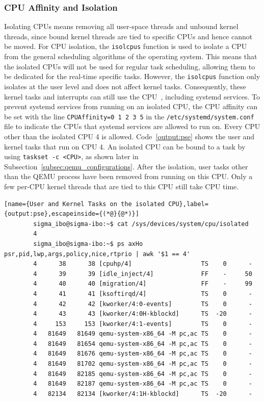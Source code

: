 \documentclass[MMR,Master,english]{style/twbook}
\begin{document}
\subsubsection{CPU Affinity and Isolation}\label{subsubsec:cpu_isolation}
Isolating CPUs means removing all user-space threads and unbound kernel threads, since bound kernel threads are tied to specific CPUs and hence cannot be moved. For CPU isolation, the \texttt{isolcpus} function is used to isolate a CPU from the general scheduling algorithms of the operating system. This means that the isolated CPUs will not be used for regular task scheduling, allowing them to be dedicated for the real-time specific tasks. However, the \texttt{isolcpus} function only isolates at the user level and does not affect kernel tasks. Consequently, these kernel tasks and interrupts can still use the CPU~\cite{maPerformanceTuningKVMbased2013}, including systemd services. To prevent systemd services from running on an isolated CPU, the CPU affinity can be set with the line \texttt{CPUAffinity=0 1 2 3 5} in the \texttt{/etc/systemd/system.conf} file to indicate the CPUs that systemd services are allowed to run on. Every CPU other than the isolated CPU 4 is allowed. Code~\ref{output:pse} shows the user and kernel tasks that run on CPU 4. An isolated CPU can be bound to a task by using \texttt{taskset -c <CPU>}, as shown later in Subsection~\ref{subsec:qemu_configurations}. After the isolation, user tasks other than the QEMU process have been removed from running on this CPU. Only a few per-CPU kernel threads that are tied to this CPU still take CPU time.

\vspace{2em}
\begin{lstlisting}[name={User and Kernel Tasks on the isolated CPU},label={output:pse},escapeinside={(*@}{@*)}]
		sigma_ibo@sigma-ibo:~$ cat /sys/devices/system/cpu/isolated
		4
		sigma_ibo@sigma-ibo:~$ ps axHo psr,pid,lwp,args,policy,nice,rtprio | awk '$1 == 4'
		4      38      38 [cpuhp/4]                   TS    0      -
		4      39      39 [idle_inject/4]             FF    -     50
		4      40      40 [migration/4]               FF    -     99
		4      41      41 [ksoftirqd/4]               TS    0      -
		4      42      42 [kworker/4:0-events]        TS    0      -
		4      43      43 [kworker/4:0H-kblockd]      TS  -20      -
		4     153     153 [kworker/4:1-events]        TS    0      -
		4   81649   81649 qemu-system-x86_64 -M pc,ac TS    0      -
		4   81649   81654 qemu-system-x86_64 -M pc,ac TS    0      -
		4   81649   81676 qemu-system-x86_64 -M pc,ac TS    0      -
		4   81649   81702 qemu-system-x86_64 -M pc,ac TS    0      -
		4   81649   82185 qemu-system-x86_64 -M pc,ac TS    0      -
		4   81649   82187 qemu-system-x86_64 -M pc,ac TS    0      -
		4   82134   82134 [kworker/4:1H-kblockd]      TS  -20      -
\end{lstlisting}
\end{document}
